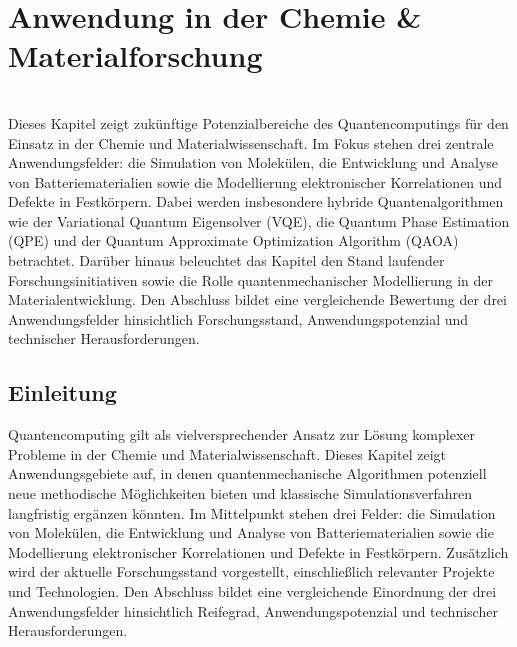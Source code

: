 
\chapter{Anwendung in der Chemie \& Materialforschung}
\label{trends} %


\abstract\\
Dieses Kapitel zeigt zukünftige Potenzialbereiche des Quantencomputings für den Einsatz in der Chemie und Materialwissenschaft. Im Fokus stehen drei zentrale Anwendungsfelder: die Simulation von Molekülen, die Entwicklung und Analyse von Batteriematerialien sowie die Modellierung elektronischer Korrelationen und Defekte in Festkörpern. Dabei werden insbesondere hybride Quantenalgorithmen wie der Variational Quantum Eigensolver (VQE), die Quantum Phase Estimation (QPE) und der Quantum Approximate Optimization Algorithm (QAOA) betrachtet. Darüber hinaus beleuchtet das Kapitel den Stand laufender Forschungsinitiativen sowie die Rolle quantenmechanischer Modellierung in der Materialentwicklung. Den Abschluss bildet eine vergleichende Bewertung der drei Anwendungsfelder hinsichtlich Forschungsstand, Anwendungspotenzial und technischer Herausforderungen.

\section{Einleitung}
\label{Chemie_Einleitung}
Quantencomputing gilt als vielversprechender Ansatz zur Lösung komplexer Probleme in der Chemie und Materialwissenschaft. Dieses Kapitel zeigt Anwendungsgebiete auf, in denen quantenmechanische Algorithmen potenziell neue methodische Möglichkeiten bieten und klassische Simulationsverfahren langfristig ergänzen könnten. Im Mittelpunkt stehen drei Felder: die Simulation von Molekülen, die Entwicklung und Analyse von Batteriematerialien sowie die Modellierung elektronischer Korrelationen und Defekte in Festkörpern. Zusätzlich wird der aktuelle Forschungsstand vorgestellt, einschließlich relevanter Projekte und Technologien. Den Abschluss bildet eine vergleichende Einordnung der drei Anwendungsfelder hinsichtlich Reifegrad, Anwendungspotenzial und technischer Herausforderungen.

